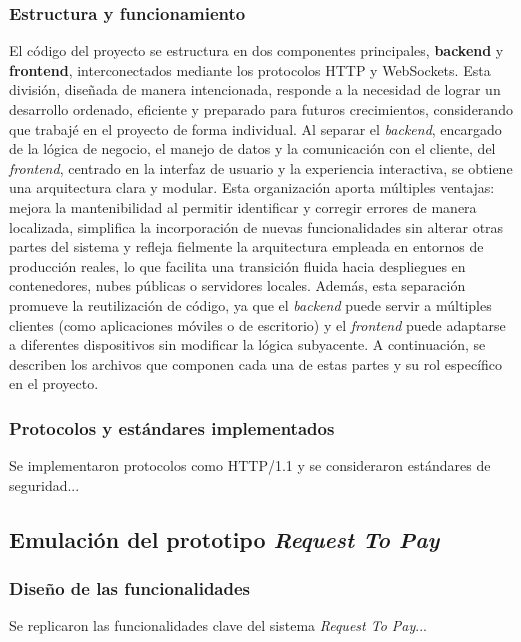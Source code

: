 \subsubsection{Estructura y funcionamiento}
\label{subsubsec:EstructuraFuncionamiento}
El código del proyecto se estructura en dos componentes principales, \textbf{backend} y \textbf{frontend}, interconectados mediante los protocolos HTTP y WebSockets. Esta división, diseñada de manera intencionada, responde a la necesidad de lograr un desarrollo ordenado, eficiente y preparado para futuros crecimientos, considerando que trabajé en el proyecto de forma individual. Al separar el \textit{backend}, encargado de la lógica de negocio, el manejo de datos y la comunicación con el cliente, del \textit{frontend}, centrado en la interfaz de usuario y la experiencia interactiva, se obtiene una arquitectura clara y modular. Esta organización aporta múltiples ventajas: mejora la mantenibilidad al permitir identificar y corregir errores de manera localizada, simplifica la incorporación de nuevas funcionalidades sin alterar otras partes del sistema y refleja fielmente la arquitectura empleada en entornos de producción reales, lo que facilita una transición fluida hacia despliegues en contenedores, nubes públicas o servidores locales. Además, esta separación promueve la reutilización de código, ya que el \textit{backend} puede servir a múltiples clientes (como aplicaciones móviles o de escritorio) y el \textit{frontend} puede adaptarse a diferentes dispositivos sin modificar la lógica subyacente. A continuación, se describen los archivos que componen cada una de estas partes y su rol específico en el proyecto.










\subsubsection{Protocolos y estándares implementados}
\label{subsubsec:Protocolos}
Se implementaron protocolos como HTTP/1.1 y se consideraron estándares de seguridad...

\subsection{Emulación del prototipo \textit{Request To Pay}}
\label{subsec:EmulacionRTP}
\subsubsection{Diseño de las funcionalidades}
\label{subsubsec:DisenoFuncionalidades}
Se replicaron las funcionalidades clave del sistema \textit{Request To Pay}...

